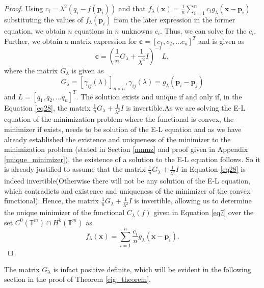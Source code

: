 \documentclass[multixcb]{amstext-l}
\theoremstyle{plain}
\theoremstyle{definition}
\theoremstyle{definition}
\theoremstyle{remark}
\numberwithin{equation}{chapter}
\begin{document}
\begin{proof}
Using $c_i = \lambda^2(q_i-f(\boldsymbol{p}_i))$ and that $f_{\lambda}(\boldsymbol{x}) = \frac{1}{n}\sum\limits_{i = 1}^n c_i g_{\lambda}(\boldsymbol{x}-\boldsymbol{p}_i)$ substituting the values of $f_{\lambda}(\boldsymbol{p}_i)$ from the later expression in the former equation, we obtain $n$ equations in $n$ unknowns $c_i$. Thus, we can solve for the $c_i$. Further, we obtain a matrix expression for $\pmb{c} = [c_1,c_2,...c_{n}]^T$ and is given as \begin{equation}\label{eq28}
 \pmb{c} = (\frac{1}{n}G_{\lambda}+\frac{1}{\lambda^2}I)^{-1}L,\end{equation} where the matrix $G_{\lambda}$ is given as 
\begin{equation}\label{eq29}
  G_{\lambda} = [\gamma_{ij}(\lambda)]_{n\times n},\gamma_{ij}(\lambda) = g_{\lambda}(\boldsymbol{p}_i-\boldsymbol{p}_j)\end{equation} and $L = [q_1,q_2,\ldots q_n]^T$. The solution exists and unique if and only if, in the Equation \ref{eq28}, the matrix $\frac{1}{n}G_{\lambda}+\frac{1}{\lambda^2}I$ is invertible.As we are solving the E-L equation of the minimization problem where the functional is convex, the minimizer if exists, needs to be solution of the E-L equation and as we have already established the existence and uniqueness of the minimizer to the minimization problem (stated in Section \ref{mnmz} and proof given in Appendix \ref{unique_minimizer}), the existence of a solution to the E-L equation follows. So it is already justified to assume that the matrix $\frac{1}{n}G_{\lambda}+\frac{1}{\lambda^2}I$ in Equation \ref{eq28} is indeed invertible(Otherwise there will not be any solution of the E-L equation, which contradicts and existence and uniqueness of the minimizer of the convex functional). Hence, the matrix $\frac{1}{n}G_{\lambda}+\frac{1}{\lambda^2}I$ is invertible, allowing us to determine the unique minimizer of the functional $C_{\lambda}(f)$ given in Equation \ref{eq7} over the set $ C^0(\mathbb{T}^m)\cap H^k(\mathbb{T}^m)$ as \begin{equation}
    \label{exp}  
  f_{\lambda}(\boldsymbol{x}) = \sum\limits_{i=1}^n \frac{c_i}{n}g_{\lambda}(\boldsymbol{x}-\boldsymbol{p}_i).
 \end{equation}\end{proof}
 
The matrix $G_{\lambda}$ is infact positive definite, which will be evident in the following section in the proof of Theorem \ref{eig_theorem}.
 
\end{document}

